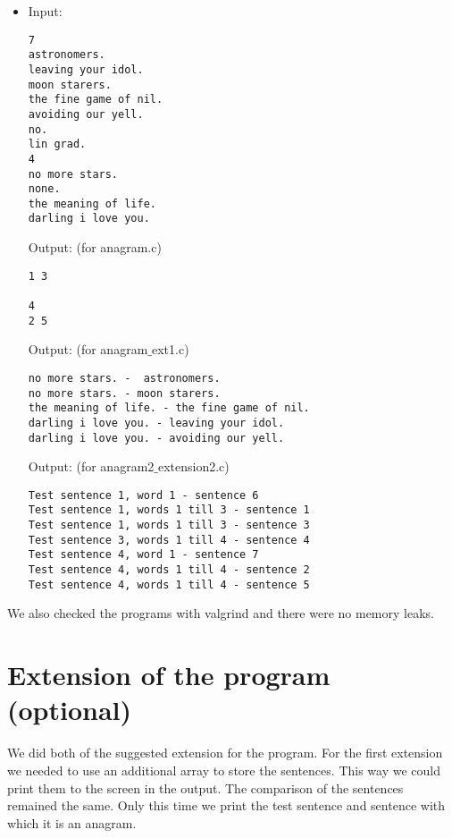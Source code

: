 \documentclass[a4paper]{article}
\begin{document}
\begin{itemize}

\item Input:
\begin{lstlisting}[style = stdio]
7 
astronomers.
leaving your idol.
moon starers.
the fine game of nil.
avoiding our yell.
no.
lin grad.
4
no more stars.
none.
the meaning of life.
darling i love you.
\end{lstlisting}

 Output: (for anagram.c)
\begin{lstlisting}[style = stdio]
1 3 

4 
2 5  
\end{lstlisting}

 Output: (for anagram$\_$ext1.c)
\begin{lstlisting}[style = stdio]
no more stars. -  astronomers. 
no more stars. - moon starers. 
the meaning of life. - the fine game of nil. 
darling i love you. - leaving your idol. 
darling i love you. - avoiding our yell. 
\end{lstlisting}

 Output: (for anagram2$\_$extension2.c)
\begin{lstlisting}[style = stdio]
Test sentence 1, word 1 - sentence 6
Test sentence 1, words 1 till 3 - sentence 1
Test sentence 1, words 1 till 3 - sentence 3
Test sentence 3, words 1 till 4 - sentence 4
Test sentence 4, word 1 - sentence 7
Test sentence 4, words 1 till 4 - sentence 2
Test sentence 4, words 1 till 4 - sentence 5
\end{lstlisting}

\end{itemize}

We also checked the programs with valgrind and there were no memory leaks.

\section{Extension of the program (optional)}

We did both of the suggested extension for the program. For the first extension we needed to use an additional array to store the sentences. This way we could print them to the screen in the output. The comparison of the sentences remained the same. Only this time we print the test sentence and sentence with which it is an anagram.\\

\newpage
\end{document}
